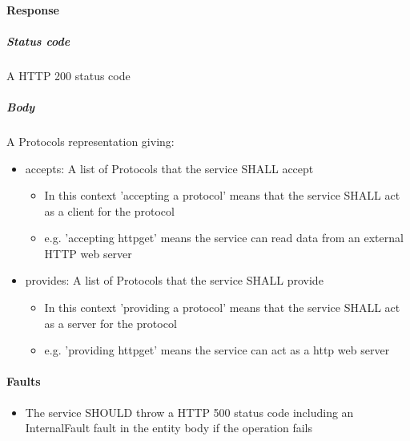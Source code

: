 \documentclass[11pt,a4paper]{ivoa}
\begin{document}
\paragraph{Response}
\subparagraph{Status code} A HTTP 200 status code
\subparagraph{Body}
A Protocols representation giving:
\begin{itemize}
    \item accepts: A list of Protocols that the service SHALL accept
    \begin{itemize}
        \item In this context 'accepting a protocol' means that the service SHALL act as a client for the protocol
        \item e.g. 'accepting httpget' means the service can read data from an external HTTP web server
    \end{itemize}
    \item provides: A list of Protocols that the service SHALL provide
    \begin{itemize}
        \item In this context 'providing a protocol' means that the service SHALL act as a server for the protocol
        \item e.g. 'providing httpget' means the service can act as a http web server
    \end{itemize}
\end{itemize}

\paragraph{Faults}
\begin{itemize}
    \item The service SHOULD throw a HTTP 500 status code including an InternalFault fault in the entity body if the operation fails
\end{itemize}
\end{document}
